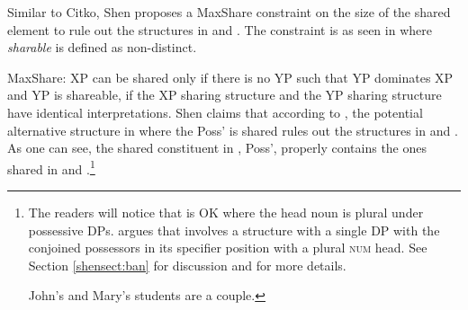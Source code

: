 \documentclass[output=paper]{langscibook}
\begin{document}
Similar to Citko, Shen proposes a MaxShare constraint on the size of the shared element to rule out the structures in  and . The constraint is as seen in  where \textit{sharable} is defined as non-distinct.
 
\ea 
	\label{shenform1}
	MaxShare: XP can be shared only if there is no YP such that YP dominates XP and YP is shareable, if the XP sharing structure and the YP sharing structure have identical interpretations. 
\z
Shen claims that according to 
, the potential alternative structure in  where the Poss' is shared rules out the structures in  and . 
As one can see, the shared constituent in , Poss', properly contains the ones shared in  and .\footnote{The readers will notice that  is OK where the head noun is plural under possessive DPs. 
\citet{Shen:2018a} argues that  involves a structure with a single DP with the conjoined possessors in its specifier position with a plural \textsc{num} head. 
See Section \ref{shensect:ban} for discussion and \citealt{Shen:2018a} for more details.

\ea 
	\label{shenftn5exi}
	John's and Mary's students are a couple.
\z
}
\end{document}
